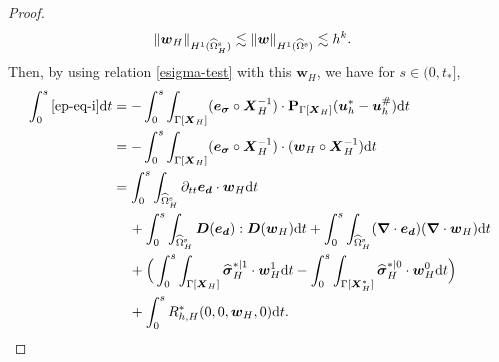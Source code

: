 \documentclass[11pt,reqno]{amsart}
\theoremstyle{definition}
\theoremstyle{plain}
\numberwithin{theorem}{section}
\numberwithin{proposition}{section}
\numberwithin{lemma}{section}
\numberwithin{equation}{section}
\newcommand{\bs}[1]{\boldsymbol{#1}}
\newcommand{\uu}[1]  {{\bs{#1}} }
\newcommand{\dep}{{{\bs{d}}}}
\newcommand{\grad}   { \uu{\nabla}    }
\def\d{\mathrm{d}}
\newcommand{\bw}{{\bs w}}
\renewcommand{\(}{\bigl(}
\renewcommand{\)}{\bigr)}
\begin{document}
\begin{proof}
\begin{subequations}
\begin{align}
&\|\bw_H\|_{H^1(\widehat{\Omega}_H^{\rm s})}
\lesssim \|\bw\|_{H^1(\widehat{\Omega}^{\rm s})} 
\lesssim h^k . \label{estimate-w-wH-3}
\end{align}
\end{subequations}
Then, by using relation \eqref{esigma-test} with this ${\bs w}_H$, we have for $s\in(0,t_*]$, 
\begin{subequations}\label{ep-eq-i-e}
\begin{align}
\int_0^s \eqref{ep-eq-i} \d t 
&= -\int_0^s\int_{\Gamma[\bs X_H]} ({\bs e}_{{\bs\sigma}}\circ {\bs X}_H^{-1} ) \cdot {\bf P}_{\Gamma[{\bs X}_H]}({\bs u}_h^*-{\bs u}_h^\#) \d t \notag\\
&= -\int_0^s\int_{\Gamma[\bs X_H]} ({\bs e}_{{\bs\sigma}}\circ {\bs X}_H^{-1} ) \cdot (\bw_H \circ{\bs X}_H^{-1}) \d t \notag\\
&= \int_0^s \int_{\widehat{\Omega}^{\rm s}_H} \partial_{tt}{\bs e}_{\dep} \cdot \bw_H \d t \label{ep-eq-i-e-a}\\
&\quad\, 
+ \int_0^s\int_{\widehat{\Omega}^{\rm s}_H} {\bs D}({\bs e}_\dep):{\bs D}(\bw_H) \d t 
+\int_0^s\int_{\widehat{\Omega}^{\rm s}_H} (\grad\cdot{\bs e}_\dep) (\grad\cdot \bw_H) \d t\label{ep-eq-i-e-b}\\ 
&\quad\, +\Big( \int_0^s \int_{\Gamma[\bs X_H]} {\widehat{\bs\sigma} }_H^{*|1} \cdot \bw_H^1 \d t - \int_0^s \int_{\Gamma[\bs X_H^*]} {\widehat{\bs\sigma} }_H^{*|0} \cdot \bw_H^0 \d t \Big) \label{ep-eq-i-e-c} \\
&\quad\, + \int_0^s R_{h,H}^*(0, 0, \bs w_H, 0) \d t. \label{ep-eq-i-e-d}
\end{align}
\end{subequations}


\end{proof}
\end{document}
